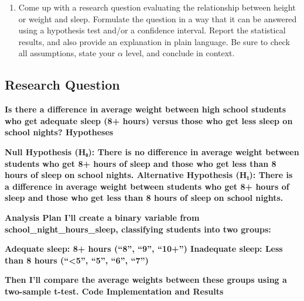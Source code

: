 \documentclass[
]{article}
\providecommand{\tightlist}{%
  \setlength{\itemsep}{0pt}\setlength{\parskip}{0pt}}
\begin{document}
\begin{enumerate}
\def\labelenumi{\arabic{enumi}.}
\setcounter{enumi}{11}
\tightlist
\item
  Come up with a research question evaluating the relationship between
  height or weight and sleep. Formulate the question in a way that it
  can be answered using a hypothesis test and/or a confidence interval.
  Report the statistical results, and also provide an explanation in
  plain language. Be sure to check all assumptions, state your
  \(\alpha\) level, and conclude in context.
\end{enumerate}

\subsection{Research Question}\label{research-question}

\textbf{Is there a difference in average weight between high school
students who get adequate sleep (8+ hours) versus those who get less
sleep on school nights? Hypotheses}

\textbf{Null Hypothesis (H₀): There is no difference in average weight
between students who get 8+ hours of sleep and those who get less than 8
hours of sleep on school nights. Alternative Hypothesis (H₁): There is a
difference in average weight between students who get 8+ hours of sleep
and those who get less than 8 hours of sleep on school nights.}

\textbf{Analysis Plan I'll create a binary variable from
school\_night\_hours\_sleep, classifying students into two groups:}

\textbf{Adequate sleep: 8+ hours (``8'', ``9'', ``10+'') Inadequate
sleep: Less than 8 hours (``\textless5'', ``5'', ``6'', ``7'')}

\textbf{Then I'll compare the average weights between these groups using
a two-sample t-test. Code Implementation and Results}
\end{document}
